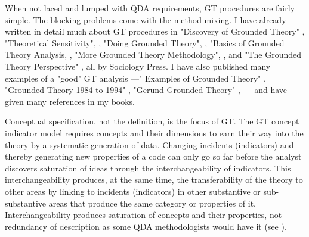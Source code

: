 When not laced and lumped with QDA requirements, GT procedures are fairly simple. 
The blocking problems come with the method mixing. 
I have already written in detail much about GT procedures in "Discovery of Grounded Theory"
\citep{book.glaser67},
"Theoretical Sensitivity", 
\citep{book.glaser78},
"Doing Grounded Theory", 
\citep{book.glaser98a},
"Basics of Grounded Theory Analysis, 
\citep{book.glaser92},
"More Grounded Theory Methodology", 
\citep{book.glaser94},
and 
"The Grounded Theory Perspective" 
\citep{book.glaser01},
 all by Sociology Press. 
I have also published many examples of a "good" GT analysis
---" Examples of Grounded Theory"
\citep{book.glaser93},
"Grounded Theory 1984 to 1994"
\citep{book.glaser95},
"Gerund Grounded Theory"
\citep{book.glaser98b},
--- and have given many references in my books.













\vspace{100pt}

Conceptual specification, not the definition, is the focus of GT. 
The GT concept indicator model requires concepts and their dimensions to earn their way into the theory by a systematic generation of data. 
Changing incidents (indicators) and thereby generating new properties of a code can only go so far before the analyst discovers saturation of ideas through the interchangeability of indicators.
This interchangeability produces, at the same time, the transferability of the theory to other areas by linking to incidents (indicators) in other substantive or sub-substantive areas that produce the same category or properties of it.
Interchangeability produces saturation of concepts and their properties, not redundancy of description as some QDA methodologists would have it 
(see \citep{article.morse95}).
\vspace{100pt}

